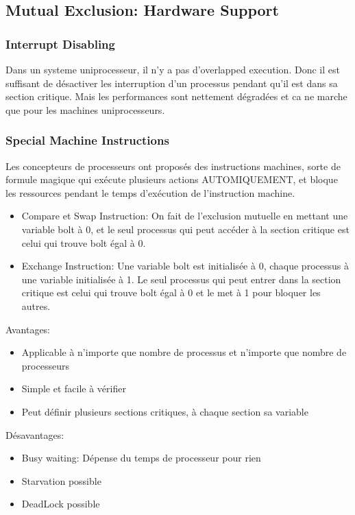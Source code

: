 \subsection{Mutual Exclusion: Hardware Support}
\subsubsection{Interrupt Disabling}
Dans un systeme uniprocesseur, il n'y a pas d'overlapped execution. Donc il est suffisant de désactiver les interruption d'un processus pendant qu'il est dans sa section critique. Mais les performances sont nettement dégradées et ca ne marche que pour les machines uniprocesseurs.
\subsubsection{Special Machine Instructions}
Les concepteurs de processeurs ont proposés des instructions machines, sorte de formule magique qui exécute plusieurs actions AUTOMIQUEMENT, et bloque les ressources pendant le temps d'exécution de l'instruction machine.
\begin{itemize}
  \item Compare et Swap Instruction: On fait de l'exclusion mutuelle en mettant une variable bolt à 0, et le seul processus qui peut accéder à la section critique est celui qui trouve bolt égal à 0. \\
  \item Exchange Instruction: Une variable bolt est initialisée à 0, chaque processus à une variable initialisée à 1. Le seul processus qui peut entrer dans la section critique est celui qui trouve bolt égal à 0 et le met à 1 pour bloquer les autres.
\end{itemize}
Avantages:
\begin{itemize}
  \item Applicable à n'importe que nombre de processus et n'importe que nombre de processeurs
  \item Simple et facile à vérifier
  \item Peut définir plusieurs sections critiques, à chaque section sa variable
\end{itemize}
Désavantages:
\begin{itemize}
  \item Busy waiting: Dépense du temps de processeur pour rien
  \item Starvation possible
  \item DeadLock possible
\end{itemize}

